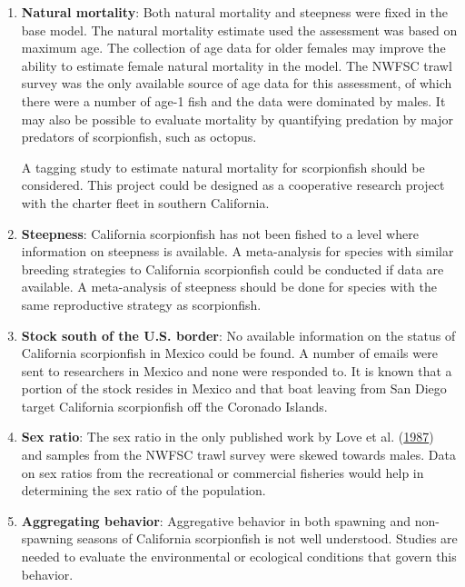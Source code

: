 \documentclass[12pt,]{article}
\begin{document}
\begin{enumerate}

\item \textbf{Natural mortality}: Both natural mortality and steepness were 
fixed in the base model.  The natural mortality estimate used the assessment 
was based on maximum age. The collection of age data for older females may improve 
the ability to estimate female natural mortality in the model.  The NWFSC trawl survey
was the only available source of age data for this assessment, of which there were a 
number of age-1 fish and the data were dominated by males.  It may also be possible 
to evaluate mortality by quantifying predation by major predators of scorpionfish, 
such as octopus. 

A tagging study to estimate natural mortality for scorpionfish should be 
considered.  This project could be designed as a cooperative research project 
with the charter fleet in southern California.

\item \textbf{Steepness}: California scorpionfish has not been fished to a level 
where information on steepness is available.  A meta-analysis for species 
with similar breeding strategies to California scorpionfish could be conducted if data are available.  A meta-analysis of steepness should be done for species with the same reproductive strategy as scorpionfish.


\item \textbf{Stock south of the U.S. border}:  No available information on the status of California scorpionfish in Mexico could be found.  A number of emails were sent to researchers 
in Mexico and none were responded to.  It is known that a portion of the stock resides 
in Mexico and that boat leaving from San Diego target California scorpionfish off 
the Coronado Islands.  

\item \textbf{Sex ratio}:  The sex ratio in the only published work by Love et al.
(\protect\hyperlink{ref-Love1987}{1987}) and samples 
from the NWFSC trawl survey were skewed towards males. Data on sex ratios from the 
recreational or commercial fisheries would help in determining the sex ratio of the population.


\item \textbf{Aggregating behavior}: Aggregative behavior in both spawning and 
non-spawning seasons of California scorpionfish is not well understood. Studies are 
needed to evaluate the environmental or ecological conditions that govern this behavior.




\end{enumerate}
\end{document}
